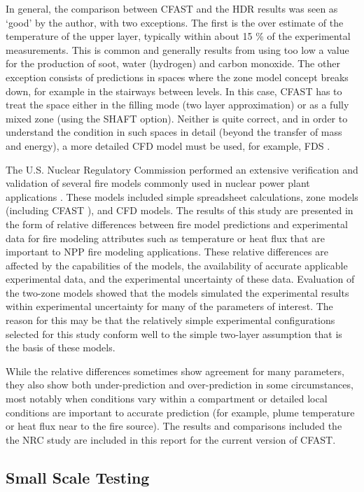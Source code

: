In general, the comparison between CFAST and the HDR results was seen as `good' by the author, with two exceptions. The first is the over estimate of the temperature of the upper layer, typically within about 15 \% of the experimental measurements. This is common and generally results from using too low a value for the production of soot, water (hydrogen) and carbon monoxide. The other exception consists of predictions in spaces where the zone model concept breaks down, for example in the stairways between levels. In this case, CFAST has to treat the space either in the filling mode (two layer approximation) or as a fully mixed zone (using the SHAFT option). Neither is quite correct, and in order to understand the condition in such spaces in detail (beyond the transfer of mass and energy), a more detailed CFD model must be used, for example, FDS \cite{FDS_Tech_Guide_5}.

The U.S. Nuclear Regulatory Commission performed an extensive verification and validation of several fire models commonly used in nuclear power plant applications \cite{NRCNUREG1824}.  These models included simple spreadsheet calculations, zone models (including CFAST \cite{NRCNUREG1824_CFAST}), and CFD models. The results of this study are presented in the form of relative differences between fire model predictions and experimental data for fire modeling attributes such as temperature or heat flux that are important to NPP fire modeling applications.  These relative differences are affected by the capabilities of the models, the availability of accurate applicable experimental data, and the experimental uncertainty of these data. Evaluation of the two-zone models showed that the models simulated the experimental results within experimental uncertainty  for many of the parameters of interest. The reason for this may be that the relatively simple experimental configurations selected for this study conform well to the simple two-layer assumption that is the basis of these models. 

While the relative differences sometimes show agreement for many parameters, they also show both under-prediction and over-prediction in some circumstances, most notably when conditions vary within a compartment or detailed local conditions are important to accurate prediction (for example, plume temperature or heat flux near to the fire source). The results and comparisons included the the NRC study are included in this report for the current version of CFAST.

\subsection{Small Scale Testing}

